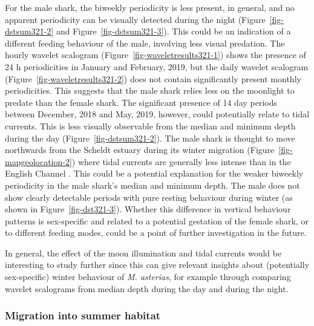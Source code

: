 \documentclass[
  authoryear,
  review,
  3p]{elsarticle}
\begin{document}
For the male shark, the biweekly periodicity is less present, in
general, and no apparent periodicity can be visually detected during the
night (Figure~\ref{fig-dstsum321-2} and Figure~\ref{fig-dstsum321-3}).
This could be an indication of a different feeding behaviour of the
male, involving less visual predation. The hourly wavelet scalogram
(Figure~\ref{fig-waveletresults321-1}) shows the presence of 24 h
periodicities in January and February, 2019, but the daily wavelet
scalogram (Figure~\ref{fig-waveletresults321-2}) does not contain
significantly present monthly periodicities. This suggests that the male
shark relies less on the moonlight to predate than the female shark. The
significant presence of 14 day periods between December, 2018 and May,
2019, however, could potentially relate to tidal currents. This is less
visually observable from the median and minimum depth during the day
(Figure~\ref{fig-dstsum321-2}). The male shark is thought to move
northwards from the Scheldt estuary during its winter migration
(Figure~\ref{fig-mapgeolocation-2}) where tidal currents are generally
less intense than in the English Channel
\citep{salomon_1993, arnold_1994}. This could be a potential explanation
for the weaker biweekly periodicity in the male shark's median and
minimum depth. The male does not show clearly detectable periods with
pure resting behaviour during winter (as shown in
Figure~\ref{fig-dst321-3}). Whether this difference in vertical
behaviour patterns is sex-specific and related to a potential gestation
of the female shark, or to different feeding modes, could be a point of
further investigation in the future.

In general, the effect of the moon illumination and tidal currents would
be interesting to study further since this can give relevant insights
about (potentially sex-specific) winter behaviour of \emph{M. asterias},
for example through comparing wavelet scalograms from median depth
during the day and during the night.

\hypertarget{sec-disc-summermig}{%
\subsubsection{Migration into summer habitat}\label{sec-disc-summermig}}
\end{document}
